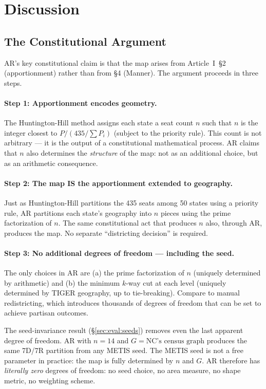 \section{Discussion}
\label{sec:discussion}

\subsection{The Constitutional Argument}
\label{sec:discussion:constitutional}

AR's key constitutional claim is that the map arises from Article~I~\S2
(apportionment) rather than from \S4 (Manner). The argument proceeds in
three steps.

\paragraph{Step 1: Apportionment encodes geometry.}
The Huntington-Hill method assigns each state a seat count $n$ such that
$n$ is the integer closest to $P / (435/\sum P_i)$ (subject to the priority
rule). This count is not arbitrary --- it is the output of a constitutional
mathematical process. AR claims that $n$ also determines the \emph{structure}
of the map: not as an additional choice, but as an arithmetic consequence.

\paragraph{Step 2: The map IS the apportionment extended to geography.}
Just as Huntington-Hill partitions the 435 seats among 50 states using a
priority rule, AR partitions each state's geography into $n$ pieces using
the prime factorization of $n$. The same constitutional act that produces $n$
also, through AR, produces the map. No separate ``districting decision'' is
required.

\paragraph{Step 3: No additional degrees of freedom --- including the seed.}
The only choices in AR are (a) the prime factorization of $n$ (uniquely
determined by arithmetic) and (b) the minimum $k$-way cut at each level
(uniquely determined by TIGER geography, up to tie-breaking). Compare to
manual redistricting, which introduces thousands of degrees of freedom that
can be set to achieve partisan outcomes.

The seed-invariance result (\S\ref{sec:eval:seeds}) removes even the last
apparent degree of freedom. AR with $n = 14$ and $G = \text{NC's census graph}$
produces the same 7D/7R partition from any METIS seed. The METIS seed is
not a free parameter in practice: the map is fully determined by $n$ and $G$.
AR therefore has \emph{literally zero} degrees of freedom: no seed choice,
no area measure, no shape metric, no weighting scheme.

